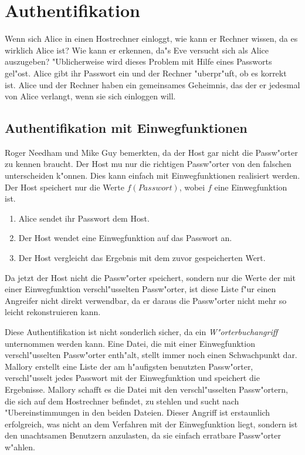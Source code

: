 \chapter{Authentifikation}

Wenn sich Alice in einen Hostrechner einloggt, wie kann er
Rechner wissen, da\3 es wirklich Alice ist? Wie kann er
erkennen, da"s Eve versucht sich als Alice auszugeben?
"Ublicherweise wird dieses Problem mit Hilfe eines Passworts
gel"ost. Alice gibt ihr Passwort ein und der Rechner "uberpr"uft, ob es
korrekt ist. Alice und der Rechner haben ein gemeinsames Geheimnis, das
der er jedesmal von Alice verlangt, wenn sie sich einloggen will.


\section{Authentifikation mit Einwegfunktionen}

Roger Needham und Mike Guy bemerkten, da\3 der Host gar nicht die
Passw"orter zu kennen braucht. Der Host mu\3 nur die richtigen
Passw"orter von den falschen unterscheiden k"onnen. Dies kann einfach
mit Einwegfunktionen realisiert werden. Der Host speichert nur die
Werte $f(Passwort)$, wobei $f$ eine Einwegfunktion ist.
\begin{enumerate}
  \item Alice sendet ihr Passwort dem Host.
  \item Der Host wendet eine Einwegfunktion auf das Passwort an.
  \item Der Host vergleicht das Ergebnis mit dem zuvor gespeicherten Wert.
\end{enumerate}
Da jetzt der Host nicht die Passw"orter speichert, sondern nur die
Werte der mit einer Einwegfunktion verschl"usselten Passw"orter, ist
diese Liste f"ur einen Angreifer nicht direkt verwendbar, da er daraus die
Passw"orter nicht mehr so leicht rekonstruieren kann.

Diese Authentifikation ist nicht sonderlich sicher, da ein {\em
W"orterbuchangriff} unternommen werden kann.  Eine Datei, die mit
einer Einwegfunktion verschl"usselten Passw"orter enth"alt, stellt
immer noch einen Schwachpunkt dar. Mallory erstellt eine Liste der am
h"aufigsten benutzten Passw"orter, verschl"usselt jedes Passwort mit
der Einwegfunktion und speichert die Ergebnisse. Mallory schafft es die
Datei mit den verschl"usselten Passw"ortern, die sich auf dem
Hostrechner befindet, zu stehlen und sucht nach "Ubereinstimmungen in
den beiden Dateien. Dieser Angriff ist erstaunlich erfolgreich, was
nicht an dem Verfahren mit der Einwegfunktion liegt, sondern ist den
unachtsamen Benutzern anzulasten, da sie einfach erratbare Passw"orter
w"ahlen.

